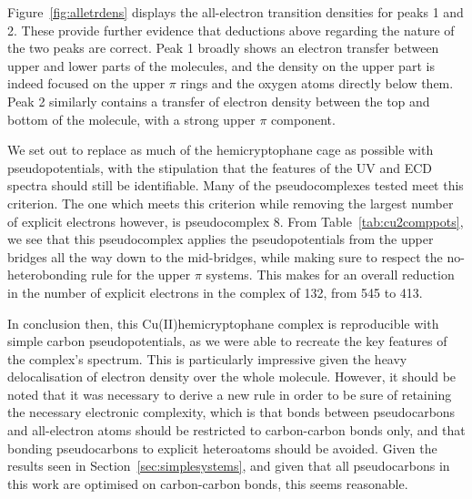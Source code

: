 \documentclass[aip,reprint,nofootinbib]{revtex4-1}
\begin{document}
Figure~\ref{fig:alletrdens} displays the all-electron transition densities for peaks 1 and 2. These provide further evidence that deductions above regarding the nature of the two peaks are correct. Peak 1 broadly shows an electron transfer between upper and lower parts of the molecules, and the density on the upper part is indeed focused on the upper $\pi$ rings and the oxygen atoms directly below them. Peak 2 similarly contains a transfer of electron density between the top and bottom of the molecule, with a strong upper $\pi$ component.

We set out to replace as much of the hemicryptophane cage as possible with pseudopotentials, with the stipulation that the features of the UV and ECD spectra should still be identifiable. Many of the pseudocomplexes tested meet this criterion. The one which meets this criterion while removing the largest number of explicit electrons however, is pseudocomplex 8. From Table~\ref{tab:cu2comppots}, we see that this pseudocomplex applies the pseudopotentials from the upper bridges all the way down to the mid-bridges, while making sure to respect the no-heterobonding rule for the upper $\pi$ systems. This makes for an overall reduction in the number of explicit electrons in the complex of 132, from 545 to 413.

In conclusion then, this Cu(II)hemicryptophane complex is reproducible with simple carbon pseudopotentials, as we were able to recreate the key features of the complex's spectrum. This is particularly impressive given the heavy delocalisation of electron density over the whole molecule. However, it should be noted that it was necessary to derive a new rule in order to be sure of retaining the necessary electronic complexity, which is that bonds between pseudocarbons and all-electron atoms should be restricted to carbon-carbon bonds only, and that bonding pseudocarbons to explicit heteroatoms should be avoided. Given the results seen in Section~\ref{sec:simplesystems}, and given that all pseudocarbons in this work are optimised on carbon-carbon bonds, this seems reasonable.
\end{document}
